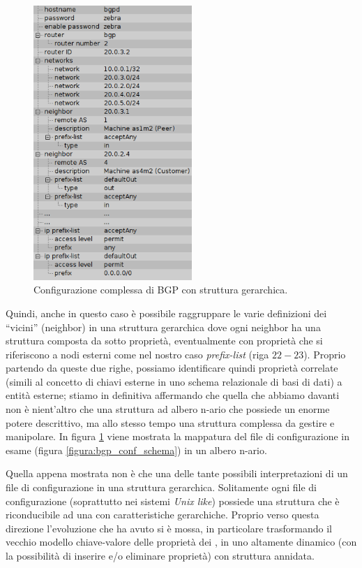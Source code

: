 \begin{figure}[!htb]
	\centering
	\includegraphics[width=6cm]{images/bgp_conf_tree.png}
	\caption{Configurazione complessa di BGP con struttura gerarchica.}
	\label{figura:bgp_conf_tree}
\end{figure}

Quindi, anche in questo caso è possibile raggruppare le varie definizioni dei ``vicini'' (neighbor) in una struttura gerarchica dove ogni neighbor ha una struttura composta da sotto proprietà, eventualmente con proprietà che si riferiscono a nodi esterni come nel nostro caso \emph{prefix-list} (riga $22-23$). Proprio partendo da queste due righe, possiamo identificare quindi proprietà correlate (simili al concetto di chiavi esterne in uno schema relazionale di basi di dati) a entità esterne; stiamo in definitiva affermando che quella che abbiamo davanti non è nient'altro che una struttura ad albero n-ario che possiede un enorme potere descrittivo, ma allo stesso tempo una struttura complessa da gestire e manipolare. In figura \ref{figura:bgp_conf_tree} viene mostrata la mappatura del file di configurazione in esame (figura \ref{figura:bgp_conf_schema}) in un albero n-ario.

Quella appena mostrata non è che una delle tante possibili interpretazioni di un file di configurazione in una struttura gerarchica. Solitamente ogni file di configurazione (soprattutto nei sistemi \emph{Unix like}) possiede una struttura che è riconducibile ad una con caratteristiche gerarchiche. Proprio verso questa direzione l'evoluzione che \visualnetkit{} ha avuto si è mossa, in particolare trasformando il vecchio modello chiave-valore delle proprietà dei \plugin{}, in uno altamente dinamico (con la possibilità di inserire e/o eliminare proprietà) con struttura annidata.


